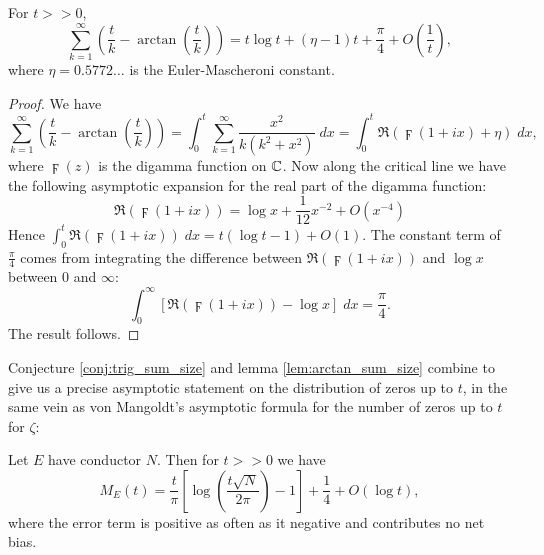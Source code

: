 \documentclass[10pt]{article}
\begin{document}
\begin{lemma}\label{lem:arctan_sum_size}
For $t >> 0$, 
\begin{equation}
\sum_{k=1}^{\infty} \left(\frac{t}{k} - \arctan\left(\frac{t}{k}\right)\right) = t\log t + (\eta-1)t + \frac{\pi}{4} + O\left(\frac{1}{t}\right),
\end{equation}
where $\eta = 0.5772\ldots$ is the Euler-Mascheroni constant.
\end{lemma}
\begin{proof}
We have
\begin{equation*}
\sum_{k=1}^{\infty} \left(\frac{t}{k} - \arctan\left(\frac{t}{k}\right)\right) = \int_{0}^{t} \sum_{k=1}^{\infty} \frac{x^2}{k(k^2+x^2)} \; dx = \int_{0}^{t} \Re\left(\digamma(1+ix) + \eta\right) \; dx,
\end{equation*}
where $\digamma(z)$ is the digamma function on $\mathbb{C}$. Now along the critical line we have the following asymptotic expansion for the real part of the digamma function:
\begin{equation}
\Re\left(\digamma(1+ix)\right) = \log x + \frac{1}{12} x^{-2} + O(x^{-4})
\end{equation}
Hence $\int_{0}^{t} \Re\left(\digamma(1+ix)\right) \; dx = t(\log t - 1)  + O(1)$. The constant term of $\frac{\pi}{4}$ comes from integrating the difference between $\Re\left(\digamma(1+ix)\right)$ and $\log x$ between $0$ and $\infty$:
\begin{equation*}
\int_{0}^{\infty} \left[\Re\left(\digamma(1+ix)\right) - \log x\right] \; dx = \frac{\pi}{4}.
\end{equation*}
The result follows.
\end{proof}

Conjecture \ref{conj:trig_sum_size} and lemma \ref{lem:arctan_sum_size} combine to give us a precise asymptotic statement on the distribution of zeros up to $t$, in the same vein as von Mangoldt's asymptotic formula for the number of zeros up to $t$ for $\zeta$:

\begin{theorem}[S.]\label{thm:zero_density}
Let $E$ have conductor $N$. Then for $t>>0$ we have
\begin{equation}
M_E(t) = \frac{t}{\pi}\left[\log\left(\frac{t\sqrt{N}}{2\pi}\right) -1 \right] + \frac{1}{4} + O(\log t),
\end{equation}
where the error term is positive as often as it negative and contributes no net bias.
\end{theorem}
\end{document}
